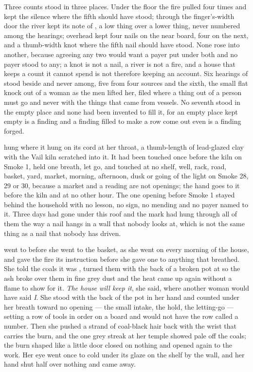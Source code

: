 Three counts stood in three places. Under the floor the fire pulled four times and kept the silence where the fifth should have stood; through the finger's-width door the river kept its note of , a low thing over a lower thing, never numbered among the hearings; overhead  kept four nails on the near board, four on the next, and a thumb-width knot where the fifth nail should have stood. None rose into another, because agreeing any two would want a payer put under both and no payer stood to any; a knot is not a nail, a river is not a fire, and a house that keeps a count it cannot spend is not therefore keeping an account. Six hearings of  stood beside and never among, five from four sources and the sixth, the small flat knock out of a woman as the men lifted her, filed where a thing out of a person must go and never with the things that came from vessels. No seventh stood in the empty place and none had been invented to fill it, for an empty place kept empty is a finding and a finding filled to make a row come out even is a finding forged.

 hung where it hung on its cord at her throat, a thumb-length of lead-glazed clay with the Vail kiln scratched into it. It had been touched once before the kiln on Smoke 1, held one breath, let go, and touched at no shelf, well, rack, road, basket, yard, market, morning, afternoon, dusk or going of the light on Smoke 28, 29 or 30, because a market and a reading are not openings; the hand goes to it before the kiln and at no other hour. The one opening before Smoke 1 stayed behind the household with no lesson, no sign, no mending and no payer named to it. Three days had gone under this roof and the mark had hung through all of them the way a nail hangs in a wall that nobody looks at, which is not the same thing as a nail that nobody has driven.

 went to  before she went to the basket, as she went on every morning of the house, and gave the fire its instruction before she gave one to anything that breathed. She told the coals it was , turned them with the back of a broken pot at  so the ash broke over them in fine grey dust and the heat came up again without a flame to show for it. \emph{The house will keep it}, she said, where another woman would have said \emph{I}. She stood with the back of the pot in her hand and counted under her breath toward no opening --- the small intake, the hold, the letting-go --- setting a row of tools in order on a board and would not have the row called a number. Then she pushed a strand of coal-black hair back with the wrist that carries the burn, and the one grey streak at her temple showed pale off the coals; the burn shaped like a little door closed on nothing and opened again to the work. Her eye went once to  cold under its glaze on the shelf by the wall, and her hand shut half over nothing and came away.

